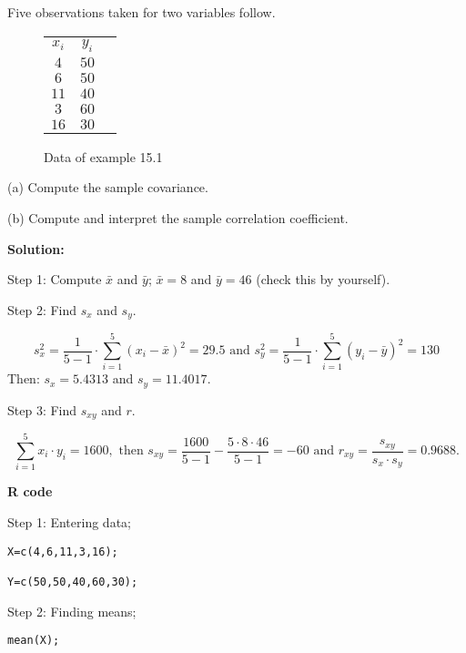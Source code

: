 \begin{example}
Five observations taken for two variables follow.
\begin{center}
\begin{figure}[H]
\centering
\begin{tabular}{ c c c }
$x_i$ & $y_i$\\
$4$ & $50$\\
$6$ & $50$\\
$11$ & $40$\\
$3$ & $60$\\
$16$ & $30$\\
\end{tabular}
\caption{Data of example 15.1}
\end{figure}
\end{center}
\vspace{-0.75cm}
(a) Compute the sample covariance.

(b) Compute and interpret the sample correlation coefficient.

\textbf{Solution:}

Step 1: Compute $\bar{x}$ and $\bar{y}$; $\bar{x} = 8$ and $\bar{y} = 46$ (check this by yourself).

Step 2: Find $s_x$ and $s_y$.
\vspace{-0.5cm}

$$s_x^2 = \frac{1}{5-1} \cdot \sum_{i = 1}^{5}(x_i - \bar{x})^2 = 29.5 \text{ and } s_y^2 = \frac{1}{5-1} \cdot \sum_{i=1}^{5}(y_i - \bar{y})^2 = 130$$
\hspace*{3.5em}Then: $s_x = 5.4313$ and $s_y = 11.4017$.

Step 3: Find $s_{xy}$ and $r$.
\vspace{-0.75cm}

$$\sum_{i=1}^{5}x_i \cdot y_i = 1600, \text{ then } s_{xy} = \frac{1600}{5-1} - \frac{5\cdot8\cdot46}{5-1} = -60 \text{ and } r_{xy} = \frac{s_{xy}}{s_x \cdot s_y} = 0.9688.$$

\textbf{R code}

Step 1: Entering data;

\begin{tcolorbox}[colback=gray!10, colframe=gray!50, arc=2mm]
\begin{verbatim}
X=c(4,6,11,3,16); 

Y=c(50,50,40,60,30);
\end{verbatim}
\end{tcolorbox}

Step 2: Finding means;

\begin{tcolorbox}[colback=gray!10, colframe=gray!50, arc=2mm]
\begin{verbatim}
mean(X);


\end{verbatim}
\end{tcolorbox}
\end{example}
